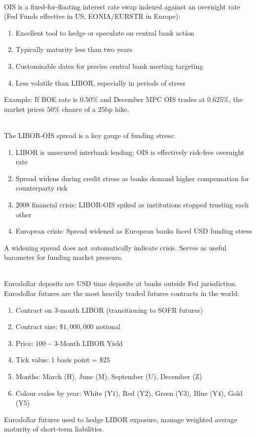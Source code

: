 \begin{remark} \\
OIS is a fixed-for-floating interest rate swap indexed against an overnight rate (Fed Funds effective in US, EONIA/EURSTR in Europe):
\begin{enumerate}[label=\roman*.]
\setlength{\itemsep}{0pt}
\item Excellent tool to hedge or speculate on central bank action
\item Typically maturity less than two years
\item Customisable dates for precise central bank meeting targeting
\item Less volatile than LIBOR, especially in periods of stress
\end{enumerate}
Example: If BOE rate is $0.50\%$ and December MPC OIS trades at $0.625\%$, the market prices $50\%$ chance of a $25$bp hike.
\end{remark}

\begin{remark} \\
The LIBOR-OIS spread is a key gauge of funding stress:
\begin{enumerate}[label=\roman*.]
\setlength{\itemsep}{0pt}
\item LIBOR is unsecured interbank lending; OIS is effectively risk-free overnight rate
\item Spread widens during credit stress as banks demand higher compensation for counterparty risk
\item 2008 financial crisis: LIBOR-OIS spiked as institutions stopped trusting each other
\item European crisis: Spread widened as European banks faced USD funding stress
\end{enumerate}
A widening spread does not automatically indicate crisis. Serves as useful barometer for funding market pressure.
\end{remark}

\begin{remark} \\
Eurodollar deposits are USD time deposits at banks outside Fed jurisdiction. Eurodollar futures are the most heavily traded futures contracts in the world:
\begin{enumerate}[label=\roman*.]
\setlength{\itemsep}{0pt}
\item Contract on $3$-month LIBOR (transitioning to SOFR futures)
\item Contract size: $\$1,000,000$ notional
\item Price: $100 - \text{3-Month LIBOR Yield}$
\item Tick value: $1$ basis point = $\$25$
\item Months: March (H), June (M), September (U), December (Z)
\item Colour codes by year: White (Y$1$), Red (Y$2$), Green (Y$3$), Blue (Y$4$), Gold (Y$5$)
\end{enumerate}
Eurodollar futures used to hedge LIBOR exposure, manage weighted average maturity of short-term liabilities.
\end{remark}

